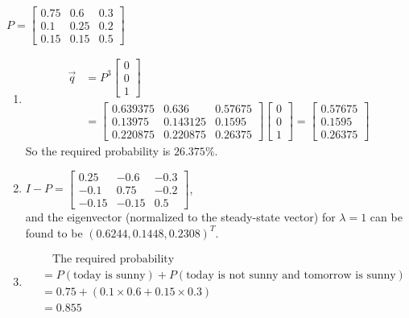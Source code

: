\begin{Answer}
$P=
\begin{bmatrix}
0.75 & 0.6 & 0.3\\
0.1 & 0.25 & 0.2\\
0.15 & 0.15 & 0.5
\end{bmatrix}$
\begin{enumerate}[label=(\alph*)]
\item 
\begin{align*}
\vec{q} &= P^3
\begin{bmatrix}
0\\
0\\
1
\end{bmatrix} \\
&=
\begin{bmatrix}
0.639375&0.636&0.57675\\ 
0.13975&0.143125&0.1595\\ 
0.220875&0.220875&0.26375
\end{bmatrix}
\begin{bmatrix}
0\\
0\\
1
\end{bmatrix} 
=
\begin{bmatrix}
0.57675\\
0.1595\\
0.26375
\end{bmatrix}  
\end{align*}
So the required probability is $26.375\%$.
\item $I-P=
\begin{bmatrix}
0.25 & -0.6 & -0.3\\
-0.1 & 0.75 & -0.2\\
-0.15 & -0.15 & 0.5    
\end{bmatrix}$,\\
and the eigenvector (normalized to the steady-state vector) for $\lambda = 1$ can be found to be $(0.6244, 0.1448, 0.2308)^T$.
\item
\begin{align*}
&\quad \text{The required probability} \\
&= P(\text{today is sunny}) + P(\text{today is not sunny and tomorrow is sunny})\\
&= 0.75 + (0.1 \times 0.6 + 0.15 \times 0.3) \\
&= 0.855
\end{align*}
\end{enumerate}
\end{Answer}

